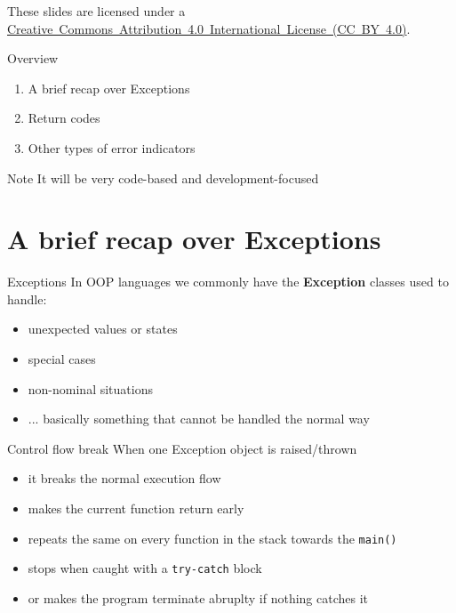 \documentclass[aspectratio=169,14pt]{beamer}
\begin{document}
\begin{frame}
    \titlepage
    
    \begin{center}
        \begin{footnotesize}
        These slides are licensed under a \href{https://creativecommons.org/licenses/by/4.0/}{Creative~Commons~Attribution~4.0~International~License~(CC~BY~4.0)}.
        \end{footnotesize}
    \end{center}
\end{frame}


\begin{frame}{Overview}
    \begin{enumerate}
        \item A brief recap over Exceptions
        \item Return codes
        \item Other types of error indicators
    \end{enumerate}
    
    \begin{block}{Note}
    It will be very code-based and development-focused
    \end{block}
\end{frame}


\section{A brief recap over Exceptions}

\begin{frame}{Exceptions}
    In OOP languages we commonly have the \textbf{Exception} classes used to handle:
    \begin{itemize}
        \item unexpected values or states
        \item special cases
        \item non-nominal situations
        \item ... basically something that cannot be handled the normal way
    \end{itemize}
\end{frame}


\begin{frame}{Control flow break}
    When one Exception object is raised/thrown
    \begin{itemize}
        \item it breaks the normal execution flow
        \item makes the current function return early
        \item repeats the same on every function in the stack towards the \texttt{main()}
        \item stops when caught with a \texttt{try-catch} block
        \item or makes the program terminate abruplty if nothing catches it
    \end{itemize}
\end{frame}
\end{document}
